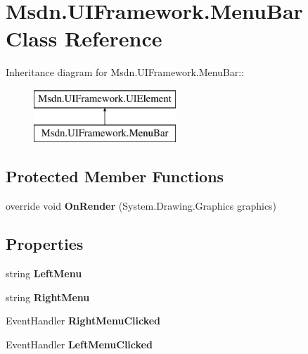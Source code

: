 \hypertarget{class_msdn_1_1_u_i_framework_1_1_menu_bar}{
\section{Msdn.UIFramework.MenuBar Class Reference}
\label{class_msdn_1_1_u_i_framework_1_1_menu_bar}
}
Inheritance diagram for Msdn.UIFramework.MenuBar::\begin{figure}[H]
\begin{center}
\leavevmode
\includegraphics[height=2cm]{class_msdn_1_1_u_i_framework_1_1_menu_bar}
\end{center}
\end{figure}
\subsection*{Protected Member Functions}
\begin{DoxyCompactItemize}
\item 
\hypertarget{class_msdn_1_1_u_i_framework_1_1_menu_bar_ad1068744109fdbc0a7e62211e6d397e4}{
override void {\bfseries OnRender} (System.Drawing.Graphics graphics)}
\label{class_msdn_1_1_u_i_framework_1_1_menu_bar_ad1068744109fdbc0a7e62211e6d397e4}

\end{DoxyCompactItemize}
\subsection*{Properties}
\begin{DoxyCompactItemize}
\item 
\hypertarget{class_msdn_1_1_u_i_framework_1_1_menu_bar_a05616e74b6092e93de2ecde1b22366ce}{
string {\bfseries LeftMenu}}
\label{class_msdn_1_1_u_i_framework_1_1_menu_bar_a05616e74b6092e93de2ecde1b22366ce}

\item 
\hypertarget{class_msdn_1_1_u_i_framework_1_1_menu_bar_a4fc885640086b1c0681f0b3927c9edab}{
string {\bfseries RightMenu}}
\label{class_msdn_1_1_u_i_framework_1_1_menu_bar_a4fc885640086b1c0681f0b3927c9edab}

\item 
\hypertarget{class_msdn_1_1_u_i_framework_1_1_menu_bar_a72a50d26b2ac89d0d0c856cf742f33d8}{
EventHandler {\bfseries RightMenuClicked}}
\label{class_msdn_1_1_u_i_framework_1_1_menu_bar_a72a50d26b2ac89d0d0c856cf742f33d8}

\item 
\hypertarget{class_msdn_1_1_u_i_framework_1_1_menu_bar_a4bcfc80bb05ff4c2ae053116688f2d77}{
EventHandler {\bfseries LeftMenuClicked}}
\label{class_msdn_1_1_u_i_framework_1_1_menu_bar_a4bcfc80bb05ff4c2ae053116688f2d77}

\end{DoxyCompactItemize}



